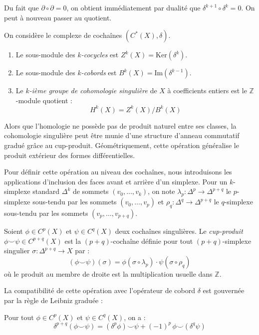Du fait que $\partial \circ \partial = 0$, on obtient immédiatement par dualité que $\delta^{k+1} \circ \delta^k = 0$. On peut à nouveau passer au quotient.

\begin{definition}
On considère le complexe de cochaînes $(C^*(X), \delta)$.
\begin{enumerate}
    \item Le sous-module des \emph{$k$-cocycles} est $Z^k(X) = \text{Ker}(\delta^k)$.
    \item Le sous-module des \emph{$k$-cobords} est $B^k(X) = \text{Im}(\delta^{k-1})$.
    \item Le \emph{$k$-ième groupe de cohomologie singulière} de $X$ à coefficients entiers est le $\mathbb{Z}$-module quotient :
    \[
    H^k(X) = Z^k(X) / B^k(X)
    \]
\end{enumerate}
\end{definition}

Alors que l'homologie ne possède pas de produit naturel entre ses classes, la cohomologie singulière peut être munie d'une structure d'anneau commutatif gradué grâce au cup-produit. Géométriquement, cette opération généralise le produit extérieur des formes différentielles.

Pour définir cette opération au niveau des cochaînes, nous introduisons les applications d'inclusion des faces avant et arrière d'un simplexe. Pour un $k$-simplexe standard $\Delta^k$ de sommets $(v_0, \dots, v_k)$, on note $\lambda_p : \Delta^p \to \Delta^{p+q}$ le $p$-simplexe sous-tendu par les sommets $(v_0, \dots, v_p)$ et $\rho_q : \Delta^q \to \Delta^{p+q}$ le $q$-simplexe sous-tendu par les sommets $(v_p, \dots, v_{p+q})$.

\begin{definition}
Soient $\phi \in C^p(X)$ et $\psi \in C^q(X)$ deux cochaînes singulières. Le \emph{cup-produit} $\phi \smile \psi \in C^{p+q}(X)$ est la $(p+q)$-cochaîne définie pour tout $(p+q)$-simplexe singulier $\sigma : \Delta^{p+q} \to X$ par :
\[
(\phi \smile \psi)(\sigma) = \phi(\sigma \circ \lambda_p) \cdot \psi(\sigma \circ \rho_q)
\]
où le produit au membre de droite est la multiplication usuelle dans $\mathbb{Z}$.
\end{definition}

La compatibilité de cette opération avec l'opérateur de cobord $\delta$ est gouvernée par la règle de Leibniz graduée :

\begin{lemma}
Pour tout $\phi \in C^p(X)$ et $\psi \in C^q(X)$, on a :
\[
\delta^{p+q}(\phi \smile \psi) = (\delta^p \phi) \smile \psi + (-1)^p \, \phi \smile (\delta^q \psi)
\]
\end{lemma}

